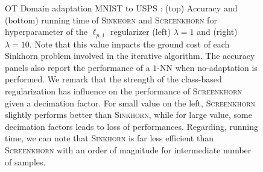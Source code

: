 \begin{figure}[htbp]
	\caption{OT Domain adaptation MNIST to USPS : (top) Accuracy and (bottom) running time of \textsc{Sinkhorn} and \textsc{Screenkhorn} for hyperparameter of the $\ell_{p,1}$ regularizer (left) $\lambda = 1$ and (right) $\lambda=10$. Note that this
	value impacts the ground cost of each Sinkhorn problem involved in the iterative algorithm. The accuracy panels
	also report the performance of a $1$-NN when no-adaptation is performed.  
	We remark that the strength of the class-based regularization has influence on the performance of \textsc{Screenkhorn} given a decimation factor. For small value on the left, \textsc{Screenkhorn} slightly performs better than \textsc{Sinkhorn}, while for large value, some
	decimation factors leads to loss of performances.
	Regarding, running time, we can note that \textsc{Sinkhorn} is far less efficient than
	\textsc{Screenkhorn}  with an order of magnitude for intermediate number of samples.
	\label{fig:otda:mnist:extra}}
\end{figure}
